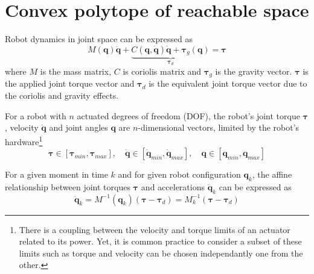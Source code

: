 


\vspace{-0.1cm}
\section{Convex polytope of reachable space}
\label{ch:polytope}
\vspace{-0.2cm}

Robot dynamics in joint space can be expressed as
\begin{equation}
    M(\bm{q})\ddot{\bm{q}} +\underbrace{ C(\bm{q},\dot{\bm{q}})\dot{\bm{q}} + \bm{\tau}_g(\bm{q}) }_{\bm{\tau}_d}= \bm{\tau}
    \label{eq:robot_model}
\end{equation}
where $M$ is the mass matrix, $C$ is coriolis matrix and $\bm{\tau}_g$ is the gravity vector. $\bm{\tau}$ is the applied joint torque vector and $\bm{\tau}_d$ is the equivalent joint torque vector due to the coriolis and gravity effects.

For a robot with $n$ actuated degrees of freedom (DOF), the robot's joint torque $\bm{\tau}$, velocity $\dot{\bm{q}}$ and joint angles $\bm{q}$ are $n$-dimensional vectors, limited by the robot's hardware\footnote{There is a coupling between the velocity and torque limits of an actuator related to its power. Yet, it is common practice to consider a subset of these limits such as torque and velocity can be chosen independantly one from the other.}
\begin{equation}
 \bm{\tau}\in\left[\bm{\tau}_{min},\bm{\tau}_{max}\right], \quad 
 \dot{\bm{q}}\in\left[\dot{\bm{q}}_{min},\dot{\bm{q}}_{max}\right], \quad \bm{q}\in\left[\bm{q}_{min},\bm{q}_{max}\right]
 \label{eq:limits}
\end{equation}


For a given moment in time $k$ and for given robot configuration $\bm{q}_k$, the affine relationship between joint torques $\bm{\tau}$ and accelerations $\ddot{\bm{q}}_{k}$ can be expressed as
\begin{equation}
    \ddot{\bm{q}}_{k} = M^{-1}(\bm{q}_k)(\bm{\tau} - \bm{\tau}_d) = M_k^{-1}(\bm{\tau} - \bm{\tau}_d)
\end{equation}

